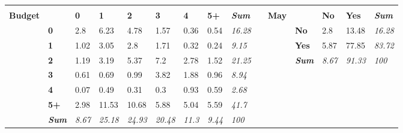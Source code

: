\begin{table}
{\begin{threeparttable}
\begin{tabular}{lllllllllllllll}
  \textit{} \\
\textbf{Budget} &
   &
  \textbf{0} &
  \textbf{1} &
  \textbf{2} &
  \textbf{3} &
  \textbf{4} &
  \textbf{5+} &
  \textit{\textbf{Sum}} &
  \textbf{} &
  \textbf{May} &
   &
  \textbf{No} &
  \textbf{Yes} &
  \textit{\textbf{Sum}} \\
 &
  \textbf{0} &
  \cellcolor[HTML]{EAEAEA}2.8 &
  \cellcolor[HTML]{D0D0D0}6.23 &
  \cellcolor[HTML]{DBDBDB}4.78 &
  \cellcolor[HTML]{F4F4F4}1.57 &
  \cellcolor[HTML]{FDFDFD}0.36 &
  \cellcolor[HTML]{FCFCFC}0.54 &
  \textit{16.28} &
   &
   &
  \textbf{No} &
  \cellcolor[HTML]{FFFFFF}2.8 &
  \cellcolor[HTML]{F3F3F3}13.48 &
  \textit{16.28} \\
 &
  \textbf{1} &
  \cellcolor[HTML]{F8F8F8}1.02 &
  \cellcolor[HTML]{E8E8E8}3.05 &
  \cellcolor[HTML]{EAEAEA}2.8 &
  \cellcolor[HTML]{F3F3F3}1.71 &
  \cellcolor[HTML]{FEFEFE}0.32 &
  \cellcolor[HTML]{FEFEFE}0.24 &
  \textit{9.15} &
   &
   &
  \textbf{Yes} &
  \cellcolor[HTML]{FCFCFC}5.87 &
  \cellcolor[HTML]{A6A6A6}77.85 &
  \textit{83.72} \\
 &
  \textbf{2} &
  \cellcolor[HTML]{F7F7F7}1.19 &
  \cellcolor[HTML]{E7E7E7}3.19 &
  \cellcolor[HTML]{D6D6D6}5.37 &
  \cellcolor[HTML]{C8C8C8}7.2 &
  \cellcolor[HTML]{EAEAEA}2.78 &
  \cellcolor[HTML]{F4F4F4}1.52 &
  \textit{21.25} &
   &
   &
  \textit{\textbf{Sum}} &
  \textit{8.67} &
  \textit{91.33} &
  \textit{100} \\
 &
  \textbf{3} &
  \cellcolor[HTML]{FBFBFB}0.61 &
  \cellcolor[HTML]{FBFBFB}0.69 &
  \cellcolor[HTML]{F8F8F8}0.99 &
  \cellcolor[HTML]{E2E2E2}3.82 &
  \cellcolor[HTML]{F1F1F1}1.88 &
  \cellcolor[HTML]{F9F9F9}0.96 &
  \textit{8.94} &
   &
   &
   &
   &
   &
  \textit{} \\
 &
  \textbf{4} &
  \cellcolor[HTML]{FFFFFF}0.07 &
  \cellcolor[HTML]{FCFCFC}0.49 &
  \cellcolor[HTML]{FEFEFE}0.31 &
  \cellcolor[HTML]{FEFEFE}0.3 &
  \cellcolor[HTML]{F9F9F9}0.93 &
  \cellcolor[HTML]{FBFBFB}0.59 &
  \textit{2.68} &
   &
   &
   &
   &
   &
  \textit{} \\
 &
  \textbf{5+} &
  \cellcolor[HTML]{E9E9E9}2.98 &
  \cellcolor[HTML]{A6A6A6}11.53 &
  \cellcolor[HTML]{ADADAD}10.68 &
  \cellcolor[HTML]{D2D2D2}5.88 &
  \cellcolor[HTML]{D9D9D9}5.04 &
  \cellcolor[HTML]{D5D5D5}5.59 &
  \textit{41.7} &
   &
   &
   &
   &
   &
  \textit{} \\
\textit{} &
  \textit{\textbf{Sum}} &
  \textit{8.67} &
  \textit{25.18} &
  \textit{24.93} &
  \textit{20.48} &
  \textit{11.3} &
  \textit{9.44} &
  \textit{100} &
  \textit{} &
  \textit{} &

\end{tabular}
\end{threeparttable}}
\end{table}
